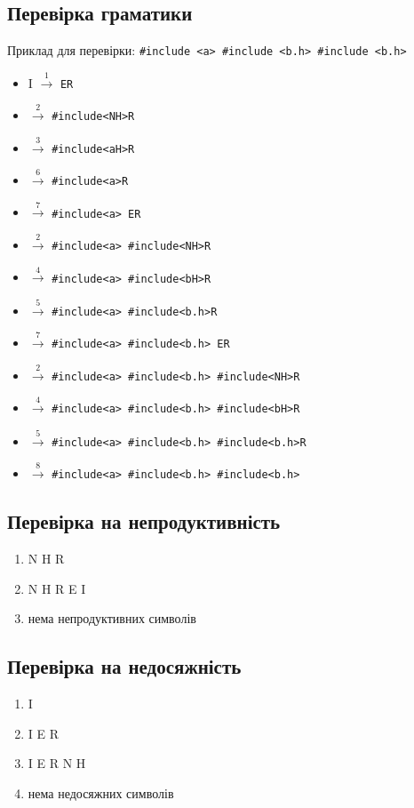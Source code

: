 \newpage
\subsection{Перевірка граматики}
Приклад для перевірки: \verb|#include <a> #include <b.h> #include <b.h>|
\begin{itemize}
    \item[]  I $\xrightarrow{1}$ \verb|ER|
    \item[]  $\xrightarrow{2}$ \verb|#include<NH>R|
    \item[]  $\xrightarrow{3}$ \verb|#include<aH>R|
    \item[]  $\xrightarrow{6}$ \verb|#include<a>R|
    \item[]  $\xrightarrow{7}$ \verb|#include<a> ER|
    \item[]  $\xrightarrow{2}$ \verb|#include<a> #include<NH>R|
    \item[]  $\xrightarrow{4}$ \verb|#include<a> #include<bH>R|
    \item[]  $\xrightarrow{5}$ \verb|#include<a> #include<b.h>R|
    \item[]  $\xrightarrow{7}$ \verb|#include<a> #include<b.h> ER|
    \item[]  $\xrightarrow{2}$ \verb|#include<a> #include<b.h> #include<NH>R|
    \item[]  $\xrightarrow{4}$ \verb|#include<a> #include<b.h> #include<bH>R|
    \item[]  $\xrightarrow{5}$ \verb|#include<a> #include<b.h> #include<b.h>R|
    \item[]  $\xrightarrow{8}$ \verb|#include<a> #include<b.h> #include<b.h>|
\end{itemize}

\subsection{Перевірка на непродуктивність}
\begin{enumerate}
    \item  N H R
    \item  N H R E I
    \item  нема непродуктивних символів
\end{enumerate}

\subsection{Перевірка на недосяжність}
\begin{enumerate}
    \item  I
    \item  I E R
    \item  I E R N H
    \item  нема недосяжних символів
\end{enumerate}
